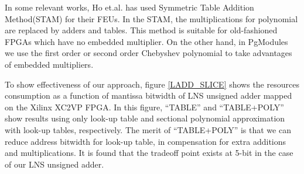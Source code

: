 \documentclass{article}
\begin{document}
In some relevant works,
Ho et.al.\cite{THYL04} has used Symmetric Table Addition Method(STAM)\cite{SS99} for their FEUs.
In the STAM, the multiplications for polynomial are replaced by adders and tables. This method is  
suitable for old-fashioned FPGAs which have no embedded multiplier.
On the other hand, in PgModules we use the first order or second order Chebyshev polynomial
to take advantages of embedded multipliers.

To show effectiveness of our approach, figure \ref{LADD_SLICE} shows
the resources consumption as a function of mantissa bitwidth of LNS
unsigned adder mapped on the Xilinx XC2VP FPGA.  In this figure,
``TABLE'' and ``TABLE+POLY'' show results using only look-up table and sectional polynomial approximation with look-up tables, respectively.
The merit of ``TABLE+POLY'' is that we can reduce address bitwidth for look-up table, 
in compensation for extra additions and multiplications.
It is found that the tradeoff point exists at 5-bit in the case of our LNS unsigned adder.





\end{document}
